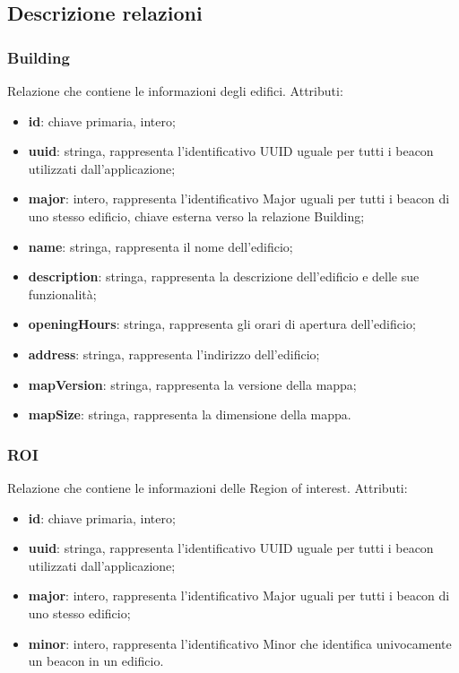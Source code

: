 \documentclass[../ManualeSviluppatore.tex]{subfiles}
\begin{document}
	\newpage
	\subsection{Descrizione relazioni}
		\subsubsection{Building}
		Relazione che contiene le informazioni degli edifici. Attributi:
		\begin{itemize}
			\item \textbf{id}: chiave primaria, intero;
			\item \textbf{uuid}: stringa, rappresenta l'identificativo UUID uguale per tutti i \gls{beacon} utilizzati dall'applicazione;
			\item \textbf{major}: intero, rappresenta l'identificativo Major uguali per tutti i \gls{beacon} di uno stesso edificio, chiave esterna verso la relazione Building;
			\item \textbf{name}: stringa, rappresenta il nome dell'edificio;
			\item \textbf{description}: stringa, rappresenta la descrizione dell'edificio e delle sue funzionalità;
			\item \textbf{openingHours}: stringa, rappresenta gli orari di apertura dell'edificio;
			\item \textbf{address}: stringa, rappresenta l'indirizzo dell'edificio;
			\item \textbf{mapVersion}: stringa, rappresenta la versione della mappa;
			\item \textbf{mapSize}: stringa, rappresenta la dimensione della mappa.
		\end{itemize}
		\subsubsection{ROI}
		Relazione che contiene le informazioni delle Region of interest. Attributi:
			\begin{itemize}
			\item \textbf{id}: chiave primaria, intero;
			\item \textbf{uuid}: stringa, rappresenta l'identificativo UUID uguale per tutti i \gls{beacon} utilizzati dall'applicazione;
			\item \textbf{major}: intero, rappresenta l'identificativo Major uguali per tutti i \gls{beacon} di uno stesso edificio;
			\item \textbf{minor}: intero, rappresenta l'identificativo Minor che identifica univocamente un \gls{beacon} in un edificio.
			\end{itemize}
\end{document}
